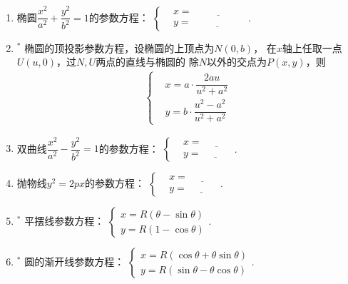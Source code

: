 \documentclass{article}
\newif\ifte
\begin{document}
\begin{multicols}{2}
\begin{enumerate}[leftmargin=20pt]
\item 椭圆$ \dfrac{x^2}{a^2}+\dfrac{y^2}{b^2}=1 $的参数方程：
$ \left\{ \begin{aligned}
    &x=\underline{\ \ifte a\cos \theta \else \hspace{2cm} \fi\ } \\
    &y=\underline{\ \ifte b\sin \theta \else \hspace{2cm} \fi\ }
\end{aligned} \right. $.

\item $^*$ 椭圆的顶投影参数方程，设椭圆的上顶点为$ N(0,b) $，
在$ x $轴上任取一点$ U(u,0) $，过$ N,U $两点的直线与椭圆的
除$ N $以外的交点为$ P(x,y) $，则
\begin{gather*}
    \left\{
    \begin{aligned} 
        & x=a\cdot\dfrac{2au}{u^2+a^2} \\
        & y=b\cdot\dfrac{u^2-a^2}{u^2+a^2}
    \end{aligned}
    \right.
\end{gather*}

\item 双曲线$ \dfrac{x^2}{a^2}-\dfrac{y^2}{b^2}=1 $的参数方程：
$ \left\{ \begin{aligned}
    &x=\underline{\ \ifte \dfrac{a}{\cos \theta}\else \hspace{1cm} \fi\ }  \\
    &y=\underline{\ \ifte b\tan\theta\else \hspace{1cm} \fi\ }
\end{aligned} \right.  $.

\item 抛物线$ y^2=2px $的参数方程：
$ \left\{ \begin{aligned}
    &x=\underline{\ \ifte 2pt^2\else \hspace{1cm} \fi\ } \\
    &y=\underline{\ \ifte 2pt\else \hspace{1cm} \fi\ }
\end{aligned} \right.  $. 

\item $^*$ 平摆线参数方程：
$ \begin{cases}
    x=R(\theta-\sin\theta) \\
    y=R(1-\cos\theta)
\end{cases}  $.

\item $^*$ 圆的渐开线参数方程：
$ \begin{cases}
    x=R(\cos\theta+\theta\sin\theta) \\
    y=R(\sin\theta-\theta\cos\theta)
\end{cases} $.


\end{enumerate}
\end{multicols}
\end{document}
